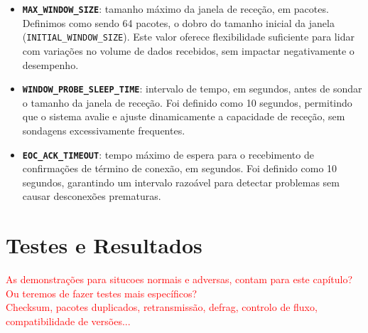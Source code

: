 \documentclass[a4paper,12pt]{scrreprt}
\begin{document}
\begin{itemize}
    \item \textbf{\texttt{MAX\_WINDOW\_SIZE}}: tamanho máximo da janela de receção, em pacotes. Definimos como sendo 64 pacotes, o dobro do tamanho
    inicial da janela (\texttt{INITIAL\_WINDOW\_SIZE}). Este valor oferece flexibilidade suficiente para lidar com variações no volume de 
    dados recebidos, sem impactar negativamente o desempenho.
    \item \textbf{\texttt{WINDOW\_PROBE\_SLEEP\_TIME}}: intervalo de tempo, em segundos, antes de sondar o tamanho da janela de receção.
    Foi definido como 10 segundos, permitindo que o sistema avalie e ajuste dinamicamente a capacidade de receção, sem sondagens excessivamente
    frequentes.
    \item \textbf{\texttt{EOC\_ACK\_TIMEOUT}}: tempo máximo de espera para o recebimento de confirmações de término de conexão, em segundos.
    Foi definido como 10 segundos, garantindo um intervalo razoável para detectar problemas sem causar desconexões prematuras.    
\end{itemize}




\chapter{Testes e Resultados}

\textcolor{red}{
    As demonstrações para situcoes normais e adversas, contam para este capítulo?
    Ou teremos de fazer testes mais específicos? \\
    Checksum, pacotes duplicados, retransmissão, defrag, controlo de fluxo, compatibilidade de versões...
}


\end{document}
